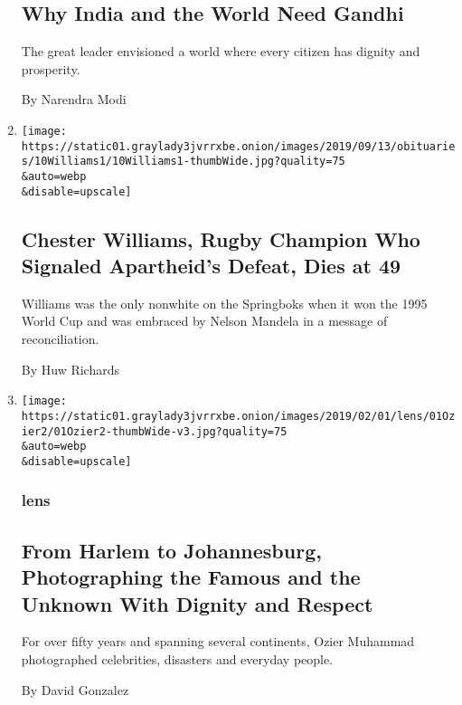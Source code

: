 \begin{enumerate}
  \hypertarget{why-india-and-the-world-need-gandhi}{%
  \subsection{Why India and the World Need
  Gandhi}\label{why-india-and-the-world-need-gandhi}}

  The great leader envisioned a world where every citizen has dignity
  and prosperity.

  By Narendra Modi
\item
  \href{/2019/09/12/sports/rugby/chester-williams-dead.html}{}

  \texttt{[image: https://static01.graylady3jvrrxbe.onion/images/2019/09/13/obituaries/10Williams1/10Williams1-thumbWide.jpg?quality=75\\\&auto=webp\\\&disable=upscale]}

  \hypertarget{chester-williams-rugby-champion-who-signaled-apartheids-defeat-dies-at-49}{%
  \subsection{Chester Williams, Rugby Champion Who Signaled Apartheid's
  Defeat, Dies at
  49}\label{chester-williams-rugby-champion-who-signaled-apartheids-defeat-dies-at-49}}

  Williams was the only nonwhite on the Springboks when it won the 1995
  World Cup and was embraced by Nelson Mandela in a message of
  reconciliation.

  By Huw Richards
\item
  \href{/2019/02/01/lens/ozier-muhammad-harlem-johannesburg.html}{}

  \texttt{[image: https://static01.graylady3jvrrxbe.onion/images/2019/02/01/lens/01Ozier2/01Ozier2-thumbWide-v3.jpg?quality=75\\\&auto=webp\\\&disable=upscale]}

  \hypertarget{lens}{%
  \subsubsection{lens}\label{lens}}

  \hypertarget{from-harlem-to-johannesburg-photographing-the-famous-and-the-unknown-with-dignity-and-respect}{%
  \subsection{From Harlem to Johannesburg, Photographing the Famous and
  the Unknown With Dignity and
  Respect}\label{from-harlem-to-johannesburg-photographing-the-famous-and-the-unknown-with-dignity-and-respect}}

  For over fifty years and spanning several continents, Ozier Muhammad
  photographed celebrities, disasters and everyday people.

  By David Gonzalez
\end{enumerate}

